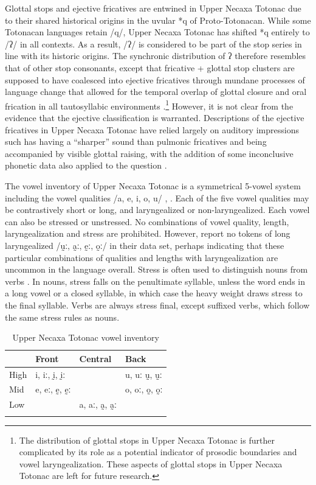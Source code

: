\documentclass[output=paper,colorlinks,citecolor=brown]{langscibook}
\begin{document}
Glottal stops and ejective fricatives are entwined in Upper Necaxa Totonac due to their shared historical origins in the uvular *q of Proto-Totonacan. While some Totonacan languages retain {/q/}, Upper Necaxa Totonac has shifted *q entirely to /ʔ/ in all contexts. As a result, /ʔ/ is considered to be part of the stop series in line with its historic origins. The synchronic distribution of ʔ therefore resembles that of other stop consonants, except that fricative + glottal stop clusters are supposed to have coalesced into ejective fricatives through mundane processes of language change that allowed for the temporal overlap of glottal closure and oral frication in all tautosyllabic environments \citep{Beck2006}.\footnote{The distribution of glottal stops in Upper Necaxa Totonac is further complicated by its role as a potential indicator of prosodic boundaries and vowel laryngealization. These aspects of glottal stops in Upper Necaxa Totonac are left for future research.} However, it is not clear from the evidence that the ejective classification is warranted. Descriptions of the ejective fricatives in Upper Necaxa Totonac have relied largely on auditory impressions such has having a ``sharper'' sound than pulmonic fricatives and being accompanied by visible glottal raising, with the addition of some inconclusive phonetic data also applied to the question \citep{Beck2006}.

The vowel inventory of Upper Necaxa Totonac is a symmetrical 5-vowel system including the vowel qualities {/a, e, i, o, u/} \citep{Beck2004}, . Each of the five vowel qualities may be contrastively short or long, and laryngealized or non-laryngealized. Each vowel can also be stressed or unstressed. No combinations of vowel quality, length, laryngealization and stress are prohibited. However, \citet{GarciaVega2019} report no tokens of long laryngealized {/ṵː, a̰ː, ḛː, o̰ː/} in their data set, perhaps indicating that these particular combinations of qualities and lengths with laryngealization are uncommon in the language overall. Stress is often used to distinguish nouns from verbs \citep{Beck2004, Beck2008}. In nouns, stress falls on the penultimate syllable, unless the word ends in a long vowel or a closed syllable, in which case the heavy weight draws stress to the final syllable. Verbs are always stress final, except suffixed verbs, which follow the same stress rules as nouns.

\begin{table}
	\caption{Upper Necaxa Totonac vowel inventory}
    \label{Table:UNTvowels}
	\begin{tabular}{llll}
		\lsptoprule
		     &    Front &    Central &  Back \\\midrule
		High & i, iː, ḭ, ḭː&            & u, uː ṵ, ṵː\\
		Mid  & e, eː, ḛ, ḛː&            & o, oː, o̰, o̰ː\\
		Low  &          &  a, aː, a̰, a̰ː & \\
		\lspbottomrule
	\end{tabular}
\end{table}
\end{document}
